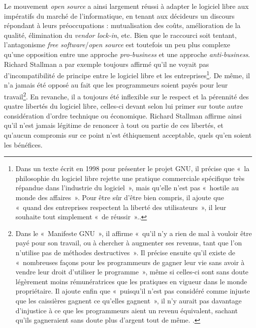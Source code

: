 \documentclass{FramateX}
\begin{document}
\begin{refsection}
Le mouvement \textit{open source} a ainsi largement réussi à adapter le
logiciel libre aux impératifs du marché de l'informatique, en tenant
aux décideurs un discours répondant à leurs préoccupations :
mutualisation des coûts, amélioration de la qualité, élimination du
\textit{vendor lock-in}, etc. Bien que le raccourci soit tentant,
l'antagonisme \textit{free software}/\textit{open source} est toutefois
un peu plus complexe qu'une opposition entre une approche
\textit{pro-business} et une approche \textit{anti-business}. Richard
Stallman a par exemple toujours affirmé qu'il ne voyait pas
d'incompatibilité de principe entre le logiciel libre et les
entreprises\footnote{Dans un texte écrit en 1998 pour présenter le
projet GNU, il précise que «~la philosophie du logiciel libre rejette
une pratique commerciale spécifique très répandue dans l'industrie du
logiciel~», mais qu'elle n'est pas «~hostile au monde des affaires~».
Pour être sûr d'être bien compris, il ajoute que «~quand des
entreprises respectent la liberté des utilisateurs~», il leur souhaite
tout simplement «~de réussir~».\cite{Stallman2002}.}. De même, il
n'a jamais été opposé au fait que les programmeurs soient payés pour
leur travail\footnote{Dans le «~Manifeste GNU~», il affirme «~qu'il
n'y a rien de mal à vouloir être payé pour son
travail, ou à chercher à augmenter ses revenus, tant que
l'on n'utilise pas de méthodes
destructives~». Il précise ensuite qu'il existe de «~nombreuses façons
pour les programmeurs de gagner leur vie sans avoir à vendre leur droit
d'utiliser le programme~», même si celles-ci sont sans doute légèrement
moins rémunératrices que les pratiques en vigueur dans le monde
propriétaire. Il ajoute enfin que «~puisqu'il n'est pas considéré comme
injuste que les caissières gagnent ce qu'elles gagnent~», il n'y aurait
pas davantage d'injustice à ce que les programmeurs aient un revenu
équivalent, sachant qu'ils gagneraient sans doute plus d'argent tout de
même. \cite{Stallman2002b}.}. En revanche, il a toujours été
inflexible sur le respect et la pérennité des quatre libertés du
logiciel libre, celles-ci devant selon lui primer sur toute autre
considération d'ordre technique ou économique. Richard Stallman affirme
ainsi qu'il n'est jamais légitime de renoncer à tout ou partie de ces
libertés, et qu'aucun compromis sur ce point n'est éthiquement
acceptable, quels qu'en soient les bénéfices. 


\end{refsection}
\end{document}
